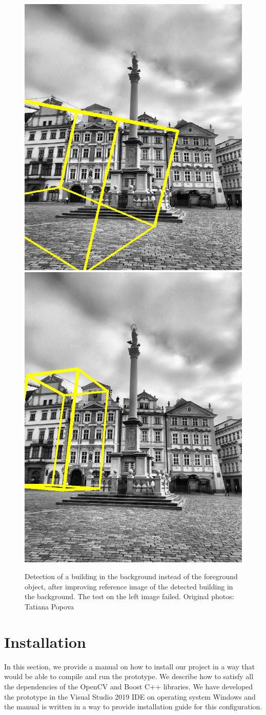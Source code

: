 \documentclass[thesis=B,english]{FITthesis}[2019/12/23]
\begin{document}
                \begin{figure}
                    \centering
                    \includegraphics[width = 0.39\linewidth]{pictures/tests/1/sloup2_vol.jpg}
                    \includegraphics[width = 0.39\linewidth]{pictures/tests/1/sloup3_vol.jpg}
                    \caption[Detection of background building instead of foreground object]{Detection of a building in the background instead of the foreground object, after improving reference image of the detected building in the background. The test on the left image failed. Original photos: Tatiana Popova}
                    \label{fig:backgroundDetection}
                \end{figure}

    \FloatBarrier            
    \section{Installation}
        In this section, we provide a manual on how to install our project in a way that would be able to compile and run the prototype. We describe how to satisfy all the dependencies of the OpenCV and Boost C++ libraries. We have developed the prototype in the Visual Studio 2019 IDE on operating system Windows and the manual is written in a way to provide installation guide for this configuration.
        
\end{document}
